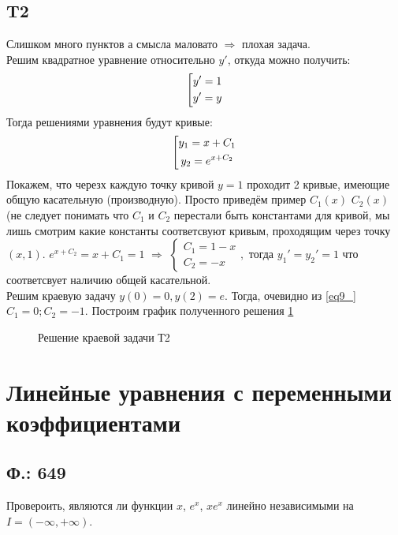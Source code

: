 \documentclass{article}
\begin{document}
\subsection{T2}
Слишком много пунктов а смысла маловато $\Rightarrow$ плохая задача.\\
Решим квадратное уравнение относительно $y'$, откуда можно получить:
\begin{equation}
    \left[
\begin{gathered}
    y'=1 \\
    y'=y \\
\end{gathered}\\
\right.
\end{equation}
Тогда решениями уравнения будут кривые:
\begin{equation}\label{eq9_}
    \left[
\begin{gathered}
    y_1=x+C_1 \\
    y_2=e^{x+C_2} \\
\end{gathered}\\
\right.
\end{equation}
Покажем, что черезх каждую точку кривой $y=1$ проходит 2 кривые, имеющие общую касательную (производную). Просто приведём пример $C_1(x)$ $C_2(x)$(не следует понимать что $C_1$ и $C_2$ перестали быть константами для кривой, мы лишь смотрим какие константы соответсвуют кривым, проходящим через точку $(x,1)$. 
$e^{x+C_2}=x+C_1=1$ $\Rightarrow $
$\begin{cases} 
C_1=1-x \\ 
C_2=-x
\end{cases}, $
 тогда   $y_1'=y_2'=1$ что соответсвует наличию общей касательной.\\
Решим краевую задачу $y(0)=0, y(2)=e$. Тогда, очевидно из \ref{eq9_} $C_1=0; C_2=-1$. Построим график полученного решения \ref{fig:T2}

\begin{figure}[ht]
\caption{Решение краевой задачи Т2}
\label{fig:T2}
\end{figure}
\section{Линейные уравнения с переменными коэффициентами}
\subsection{Ф.: 649}
Провероить, являются ли функции $x$, $e^x$, $x e^x$ линейно независимыми на $I=(-\infty,+\infty)$.\\
\end{document}
